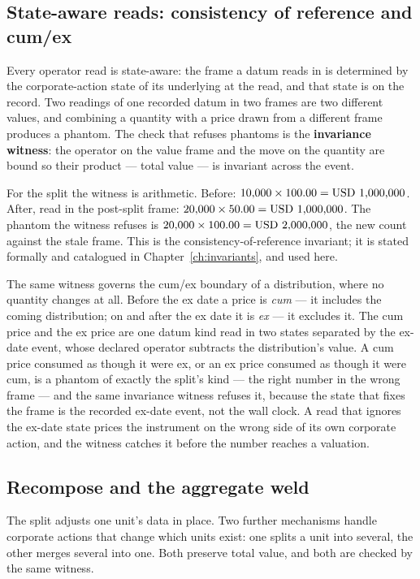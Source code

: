 \subsection{State-aware reads: consistency of reference and cum/ex}\label{sec:witness}

Every operator read is state-aware: the frame a datum reads in is determined by the
corporate-action state of its underlying at the read, and that state is on the record. Two
readings of one recorded datum in two frames are two different values, and combining a
quantity with a price drawn from a different frame produces a phantom. The check that
refuses phantoms is the \textbf{invariance witness}: the operator on the value frame and
the move on the quantity are bound so their product --- total value --- is invariant across
the event.

For the split the witness is arithmetic. Before: $10{,}000 \times 100.00 = \mbox{USD~1{,}000{,}000}$.
After, read in the post-split frame: $20{,}000 \times 50.00 = \mbox{USD~1{,}000{,}000}$. The
phantom the witness refuses is $20{,}000 \times 100.00 = \mbox{USD~2{,}000{,}000}$, the new count
against the stale frame. This is the consistency-of-reference invariant; it is stated
formally and catalogued in Chapter~\ref{ch:invariants}, and used here.

The same witness governs the cum/ex boundary of a distribution, where no quantity changes
at all. Before the ex date a price is \emph{cum} --- it includes the coming distribution;
on and after the ex date it is \emph{ex} --- it excludes it. The cum price and the ex price
are one datum kind read in two states separated by the ex-date event, whose declared
operator subtracts the distribution's value. A cum price consumed as though it were ex, or
an ex price consumed as though it were cum, is a phantom of exactly the split's kind ---
the right number in the wrong frame --- and the same invariance witness refuses it, because
the state that fixes the frame is the recorded ex-date event, not the wall clock. A read
that ignores the ex-date state prices the instrument on the wrong side of its own corporate
action, and the witness catches it before the number reaches a valuation.

\subsection{Recompose and the aggregate weld}\label{sec:recompose}

The split adjusts one unit's data in place. Two further mechanisms handle corporate actions
that change which units exist: one splits a unit into several, the other merges several into
one. Both preserve total value, and both are checked by the same witness.

